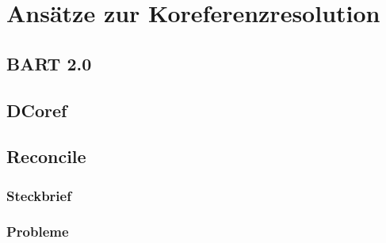 \documentclass[a4paper,12pt,titlepage=true, ngerman]{scrartcl}
\begin{document}

\newpage

\section{Ansätze zur Koreferenzresolution}\label{Ansätze zur Koreferenzresolution} %



\subsection{BART 2.0}





\subsection{DCoref}





\subsection{Reconcile} %



\subsubsection{Steckbrief} %



\subsubsection{Probleme} %



\newpage
\end{document}
